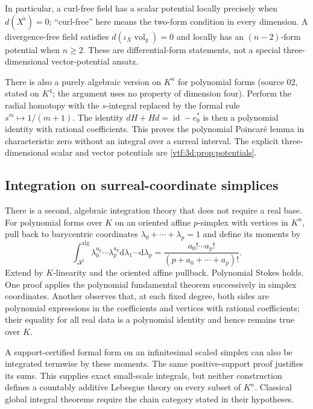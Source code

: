 \documentclass[11pt,letterpaper]{article}
\theoremstyle{definition}
\theoremstyle{remark}
\newcommand{\id}{\operatorname{id}}\newcommand{\tr}{\operatorname{tr}}
\newcommand{\vol}{\operatorname{vol}}\newcommand{\GL}{\operatorname{GL}}
\newcommand{\dd}{\mathrm d}
\begin{document}
In particular, a curl-free field has a scalar potential locally precisely
when $d(X^\flat)=0$; ``curl-free'' here means the two-form condition in every
dimension. A divergence-free field satisfies
$d(\iota_X\vol_g)=0$ and locally has an $(n-2)$-form potential when $n\ge2$.
These are differential-form statements, not a special three-dimensional
vector-potential ansatz.

There is also a purely algebraic version on $K^n$ for polynomial forms (source
02, stated on $K^4$; the argument uses no property of dimension four). Perform
the radial homotopy with the $s$-integral replaced by the formal rule
$s^m\mapsto1/(m+1)$. The identity $dH+Hd=\id-e_0^*$ is then a polynomial identity
with rational coefficients. This proves the polynomial Poincar\'e lemma in
characteristic zero without an integral over a surreal interval. The explicit
three-dimensional scalar and vector potentials are
\cref{vtf:3d:prop:potentials}.

\subsection{Integration on surreal-coordinate simplices}

There is a second, algebraic integration theory that does not require a real
base. For polynomial forms over $K$ on an oriented affine $p$-simplex with
vertices in $K^n$, pull back to barycentric coordinates
$\lambda_0+\cdots+\lambda_p=1$ and define its moments by
\begin{equation}\label{vtf:eq:simplex}
 \int_{\Delta^p}^{\mathrm{alg}}
 \lambda_0^{a_0}\cdots\lambda_p^{a_p}
 \dd\lambda_1\cdots\dd\lambda_p
 =\frac{a_0!\cdots a_p!}{(p+a_0+\cdots+a_p)!}.
\end{equation}
Extend by $K$-linearity and the oriented affine pullback. Polynomial Stokes
holds. One proof applies the polynomial fundamental theorem successively in
simplex coordinates. Another observes that, at each fixed degree, both sides
are polynomial expressions in the coefficients and vertices with rational
coefficients; their equality for all real data is a polynomial identity and
hence remains true over $K$.

A support-certified formal form on an infinitesimal scaled simplex can also
be integrated termwise by these moments. The same positive-support proof
justifies its sums. This supplies exact small-scale integrals, but neither
construction defines a countably additive Lebesgue theory on every subset of
$K^n$. Classical global integral theorems require the chain category stated
in their hypotheses.
\end{document}
